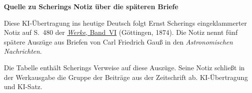 \clearpage\thispagestyle{empty}
\begin{center}\textbf{Quelle zu Scherings Notiz über die späteren Briefe}\end{center}
\noindent Diese KI-Übertragung ins heutige Deutsch folgt Ernst Scherings eingeklammerter Notiz auf S.~480 der \href{https://gdz.sub.uni-goettingen.de/id/PPN236007467}{\textit{Werke}, Band~VI} (Göttingen, 1874). Die Notiz nennt fünf spätere Auszüge aus Briefen von Carl Friedrich Gauß in den \textit{Astronomischen Nachrichten}.
\par\smallskip\noindent Die Tabelle enthält Scherings Verweise auf diese Auszüge. Seine Notiz schließt in der Werkausgabe die Gruppe der Beiträge aus der Zeitschrift ab. KI-Übertragung und KI-Satz.
\clearpage

